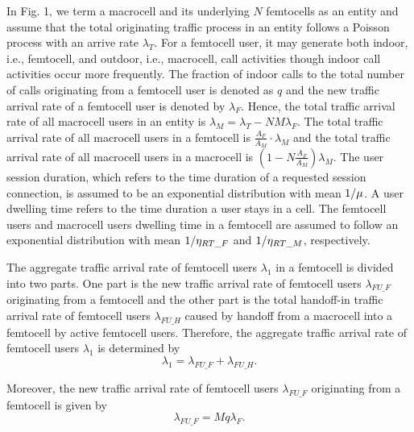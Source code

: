 \documentclass[10pt,final,journal,letterpaper,twoside,twocolumn]{IEEEtran}
\begin{document}
In Fig. 1, we term a macrocell and its underlying $N$ femtocells as an entity
and assume that the total originating traffic process in an entity follows a
Poisson process with an arrive rate ${\lambda _T}$. For a femtocell user, it
may generate both indoor, i.e., femtocell, and outdoor, i.e., macrocell, call activities though indoor call activities occur more frequently. The fraction of indoor calls to the total number of calls originating from a femtocell user is denoted as $q$ and the new traffic arrival rate of a femtocell
user is denoted by ${\lambda _F}$. Hence, the total traffic arrival rate of all macrocell users in an entity is
${\lambda _M} = {\lambda _T} - NM{\lambda _F}$. The total traffic arrival rate of all macrocell users in a femtocell is $\frac{{{A_F}}}{{{A_M}}} \cdot {\lambda _M}$
and the total traffic arrival rate of all macrocell users in a macrocell is $\left( {1
- N\frac{{{A_F}}}{{{A_M}}}} \right){\lambda _M}$. The user session duration, which refers to the time duration of a requested session connection, is
assumed to be an exponential distribution with mean ${1 \mathord{\left/
{\vphantom {1 \mu }} \right. \kern-\nulldelimiterspace} \mu }$. A user dwelling time refers to the time
duration a user stays in a cell. The femtocell users and macrocell users dwelling time in a femtocell are assumed to follow an exponential distribution with mean
${1 \mathord{\left/ {\vphantom {1 {{\eta _{RT\_F}}}}} \right.
\kern-\nulldelimiterspace} {{\eta _{RT\_F}}}}$ and ${1 \mathord{\left/
{\vphantom {1 {{\eta _{RT\_M}}}}} \right. \kern-\nulldelimiterspace} {{\eta
_{RT\_M}}}}$, respectively.


The aggregate traffic arrival rate of femtocell users ${\lambda _1}$ in a femtocell  is
divided into two parts. One part is the new traffic arrival rate of femtocell users ${\lambda _{FU\_F}}$ originating from a femtocell and the other part is the total handoff-in traffic arrival rate of femtocell users ${\lambda
_{FU\_H}}$ caused by handoff from a macrocell into a femtocell by active
femtocell users. Therefore, the aggregate traffic arrival rate of femtocell users ${\lambda
_1}$ is determined by
\begin{equation}
{\lambda _1} = {\lambda _{FU\_F}} + {\lambda _{FU\_H}}.
\label{eq1}
\tag{1}
\end{equation}


Moreover, the new traffic arrival rate of femtocell users ${\lambda _{FU\_F}}$ originating from a femtocell is given by
\begin{equation}
{\lambda _{FU\_F}} = Mq{\lambda _F}.
\label{eq2}
\tag{2}
\end{equation}
\end{document}
